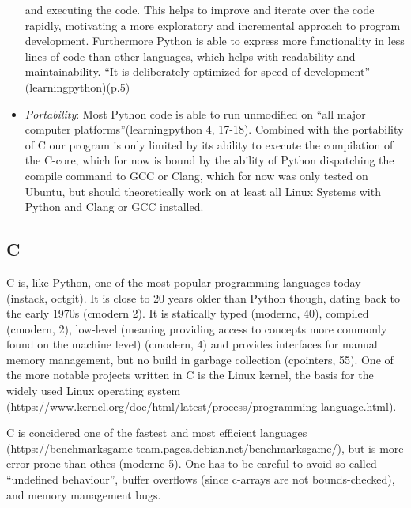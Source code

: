 \begin{itemize}
  and executing the code. This helps to improve and iterate over the
  code rapidly, motivating a more exploratory and incremental approach
  to program development. Furthermore Python is able to express more
  functionality in less lines of code than other languages, which helps
  with readability and maintainability. ``It is deliberately optimized
  for speed of development'' (learningpython)(p.5)
\item
  \emph{Portability}: Most Python code is able to run unmodified on
  ``all major computer platforms''(learningpython 4, 17-18). Combined
  with the portability of C our program is only limited by its ability
  to execute the compilation of the C-core, which for now is bound by
  the ability of Python dispatching the compile command to GCC or Clang,
  which for now was only tested on Ubuntu, but should theoretically work
  on at least all Linux Systems with Python and Clang or GCC installed.
\end{itemize}

\hypertarget{c}{%
\subsection{C}\label{c}}

C is, like Python, one of the most popular programming languages today
(instack, octgit). It is close to 20 years older than Python though,
dating back to the early 1970s (cmodern 2). It is statically typed
(modernc, 40), compiled (cmodern, 2), low-level (meaning providing
access to concepts more commonly found on the machine level) (cmodern,
4) and provides interfaces for manual memory management, but no build in
garbage collection (cpointers, 55). One of the more notable projects
written in C is the Linux kernel, the basis for the widely used Linux
operating system
(https://www.kernel.org/doc/html/latest/process/programming-language.html).

C is concidered one of the fastest and most efficient languages
(https://benchmarksgame-team.pages.debian.net/benchmarksgame/), but is
more error-prone than othes (modernc 5). One has to be careful to avoid
so called ``undefined behaviour'', buffer overflows (since c-arrays are
not bounds-checked), and memory management bugs.

